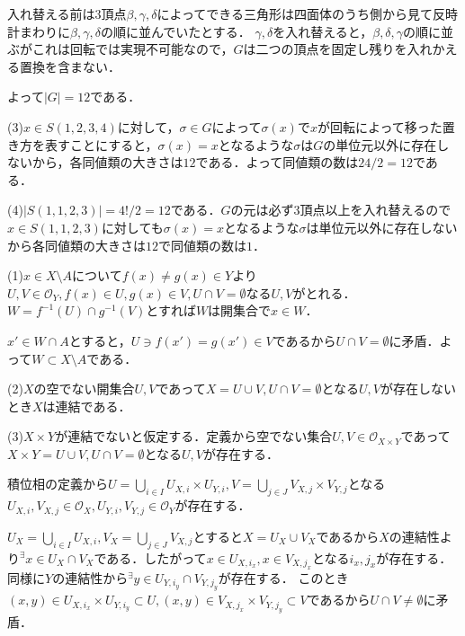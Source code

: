 \documentclass[
		book,
		head_space=20mm,
		foot_space=20mm,
		gutter=10mm,
		line_length=190mm
]{jlreq}
\begin{document}
入れ替える前は3頂点$\beta,\gamma,\delta$によってできる三角形は四面体のうち側から見て反時計まわりに$\beta,\gamma,\delta$の順に並んでいたとする．
$\gamma,\delta$を入れ替えると，$\beta,\delta,\gamma$の順に並ぶがこれは回転では実現不可能なので，$G$は二つの頂点を固定し残りを入れかえる置換を含まない．

よって$|G|=12$である．

(3)$x\in S(1,2,3,4)$に対して，$\sigma\in G$によって$\sigma(x)$で$x$が回転によって移った置き方を表すことにすると，$\sigma(x)=x$となるような$\sigma$は$G$の単位元以外に存在しないから，各同値類の大きさは$12$である．よって同値類の数は$24/2=12$である．

(4)$|S(1,1,2,3)|=4!/2=12$である．$G$の元は必ず3頂点以上を入れ替えるので$x\in S(1,1,2,3)$に対しても$\sigma(x)=x$となるような$\sigma$は単位元以外に存在しないから各同値類の大きさは$12$で同値類の数は$1$．

(1)$x \in X\setminus A$について$f(x)\neq g(x)\in Y$より$U,V \in \mathcal{O}_Y,f(x)\in U,g(x)\in V ,U\cap V = \emptyset$なる$U,V$がとれる．
$W=f^{-1}(U)\cap g^{-1}(V)$とすれば$W$は開集合で$x \in W$．

$x'\in W \cap A$とすると，$U\ni f(x')=g(x')\in V$であるから$U\cap V = \emptyset$に矛盾．よって$W\subset X\setminus A$である．

(2)$X$の空でない開集合$U,V$であって$X=U\cup V, U \cap V= \emptyset$となる$U,V$が存在しないとき$X$は連結である．

(3)$X \times Y$が連結でないと仮定する．定義から空でない集合$U,V \in \mathcal{O}_{X\times Y}$であって$X\times Y=U\cup V,U\cap V = \emptyset$となる$U,V$が存在する．

積位相の定義から$U=\bigcup_{i\in I}U_{X,i}\times U_{Y,i},V=\bigcup_{j\in J}V_{X,j}\times V_{Y,j}$となる$U_{X,i},V_{X,j}\in \mathcal{O}_X,U_{Y,i},V_{Y,j}\in \mathcal{O}_Y$が存在する．

$U_X = \bigcup_{i\in I}U_{X,i},V_X = \bigcup_{j\in J}V_{X,j}$とすると$X=U_X\cup V_X$であるから$X$の連結性より${}^\exists x\in U_X \cap V_X$である．したがって$x\in U_{X,i_x},x\in V_{X,j_x}$となる$i_x,j_x$が存在する．
同様に$Y$の連結性から${}^\exists y\in U_{Y,i_y}\cap V_{Y,j_y}$が存在する．
このとき$(x,y)\in U_{X,i_x}\times U_{Y,i_y}\subset U,(x,y)\in V_{X,j_x}\times V_{Y,j_y}\subset V$であるから$U\cap V \neq \emptyset$に矛盾．
\end{document}
